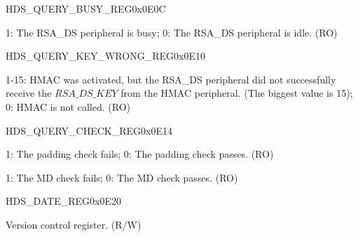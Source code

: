 \begin{register}{H}{DS\_QUERY\_BUSY\_REG}{0x0E0C}\label{regdesc:DSQUERYBUSYREG}
%
%
\regnewline%
\begin{regdesc}\begin{reglist}
\item [DS\_QUERY\_BUSY] 1: The RSA\_DS peripheral is busy; 0: The RSA\_DS peripheral is idle. (RO)
\end{reglist}\end{regdesc}
\end{register}



\begin{register}{H}{DS\_QUERY\_KEY\_WRONG\_REG}{0x0E10}\label{regdesc:DSQUERYKEYWRONGREG}
%
%
\regnewline%
\begin{regdesc}\begin{reglist}
\item [DS\_QUERY\_KEY\_WRONG] 1-15: HMAC was activated, but the RSA\_DS peripheral did not successfully receive the \begin{math}RSA\_DS\_KEY\end{math} from the HMAC peripheral. (The biggest value is 15); 0: HMAC is not called. (RO)
\end{reglist}\end{regdesc}
\end{register}




\begin{register}{H}{DS\_QUERY\_CHECK\_REG}{0x0E14}\label{regdesc:DSQUERYCHECKREG}
%
%
%
\regnewline%
\begin{regdesc}\begin{reglist}
\item [DS\_PADDING\_BAD] 1: The padding check fails; 0: The padding check passes. (RO)
\item [DS\_MD\_ERROR] 1: The MD check fails; 0: The MD check passes. (RO)
\end{reglist}\end{regdesc}
\end{register}




\begin{register}{H}{DS\_DATE\_REG}{0x0E20}\label{regdesc:DSDATEREG}
%
%
\regnewline%
\begin{regdesc}\begin{reglist}
\item [DS\_DATE] Version control register. (R/W)
\end{reglist}\end{regdesc}
\end{register}
